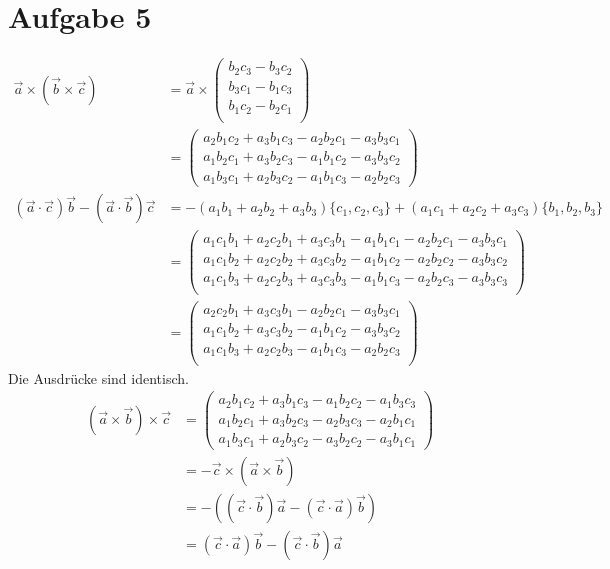 \documentclass[a4paper,10pt]{extarticle}
\begin{document}
  \section*{Aufgabe 5}
\begin{align*}
  \vec{a} \times (\vec{b} \times \vec{c}) &=
  \vec{a} \times 
  \left(\begin{array}{c}
    b_2 c_3-b_3 c_2\\
    b_3 c_1-b_1 c_3\\
    b_1 c_2-b_2 c_1\\
  \end{array}\right)
  \\&= 
  \left(\begin{array}{c}
    a_2 b_1 c_2+a_3 b_1 c_3-a_2 b_2 c_1-a_3 b_3 c_1\\
    a_1 b_2 c_1+a_3 b_2 c_3-a_1 b_1 c_2-a_3 b_3 c_2\\
    a_1 b_3 c_1+a_2 b_3 c_2-a_1 b_1 c_3-a_2 b_2 c_3
  \end{array}\right)\\
  (\vec{a}\cdot\vec{c})\vec{b}-(\vec{a}\cdot\vec{b})\vec{c}
  &= -(a_1 b_1 + a_2 b_2 + a_3 b_3)\{c_1, c_2, c_3\} + (a_1 c_1 + a_2 c_2 + a_3 c_3)\{b_1, 
  b_2, b_3\}\\
  &=\left(\begin{array}{c}
    a_1 c_1 b_1 + a_2 c_2 b_1 + a_3 c_3 b_1 - a_1 b_1 c_1 - a_2 b_2 c_1 - a_3 b_3 c_1\\
    a_1 c_1 b_2 + a_2 c_2 b_2 + a_3 c_3 b_2 - a_1 b_1 c_2 - a_2 b_2 c_2 - a_3 b_3 c_2\\
    a_1 c_1 b_3 + a_2 c_2 b_3 + a_3 c_3 b_3 - a_1 b_1 c_3 - a_2 b_2 c_3 - a_3 b_3 c_3\\
  \end{array}\right)
  \\&=\left(\begin{array}{c}
    a_2 c_2 b_1 + a_3 c_3 b_1 - a_2 b_2 c_1 - a_3 b_3 c_1\\
    a_1 c_1 b_2 + a_3 c_3 b_2 - a_1 b_1 c_2 - a_3 b_3 c_2\\
    a_1 c_1 b_3 + a_2 c_2 b_3 - a_1 b_1 c_3 - a_2 b_2 c_3\\
  \end{array}\right)
\end{align*}
Die Ausdrücke sind identisch.
\begin{align*}
  (\vec{a}\times\vec{b})\times\vec{c} &=
  \left(\begin{array}{c}
    a_2 b_1 c_2 + a_3 b_1 c_3 - a_1 b_2 c_2 - a_1 b_3 c_3\\
    a_1 b_2 c_1 + a_3 b_2 c_3 - a_2 b_3 c_3 - a_2 b_1 c_1\\
    a_1 b_3 c_1 + a_2 b_3 c_2 - a_3 b_2 c_2 - a_3 b_1 c_1 
  \end{array}\right) \\
  &= -\vec{c}\times(\vec{a}\times\vec{b})\\
  &= -((\vec{c}\cdot\vec{b})\vec{a} - (\vec{c}\cdot\vec{a})\vec{b})\\
  &= (\vec{c}\cdot\vec{a})\vec{b} - (\vec{c}\cdot\vec{b})\vec{a}
\end{align*}
\end{document}
